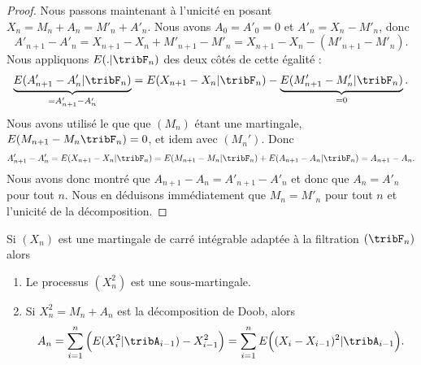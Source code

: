 \begin{proof}
    Nous passons maintenant à l'unicité en posant \( X_n=M_n+A_n=M'_n+A'_n\). Nous avons \( A_0=A'_0=0\) et \( A'_n=X_n-M'_n\), donc
    \begin{equation}
        A'_{n+1}-A'_n=X_{n+1}-X_n+M'_{n+1}-M'_n=X_{n+1}-X_n-(M'_{n+1}-M'_n).
    \end{equation}
    Nous appliquons \( E(.|\tribF_n)\) des deux côtés de cette égalité :
    \begin{equation}
        \underbrace{E(A'_{n+1}-A'_n|\tribF_n)}_{=A'_{n+1}-A'_n}=E(X_{n+1}-X_n|\tribF_n)-\underbrace{E(M'_{n+1}-M'_n|\tribF_n)}_{=0}.
    \end{equation}
    Nous avons utilisé le que que \( (M_n)\) étant une martingale, \( E(M_{n+1}-M_n\tribF_n)=0\), et idem avec \( (M_n')\). Donc
    \begin{equation}
        A'_{n+1}-A'_n=E(X_{n+1}-X_n|\tribF_n)=E(M_{n+1}-M_n|\tribF_n)+E(A_{n+1}-A_n|\tribF_n)=A_{n+1}-A_n.
    \end{equation}
    Nous avons donc montré que \( A_{n+1}-A_n=A'_{n+1}-A'_n\) et donc que \( A_n=A'_n\) pour tout \( n\). Nous en déduisons immédiatement que \( M_n=M'_n\) pour tout \( n\) et l'unicité de la décomposition.
\end{proof}

\begin{lemma}   \label{LemPVgeKfc}
    Si \( (X_n)\) est une martingale de carré intégrable adaptée à la filtration \( (\tribF_n)\) alors
    \begin{enumerate}
        \item
            Le processus \( (X_n^2)\) est une sous-martingale.
        \item
            Si \( X_n^2=M_n+A_n\) est la décomposition de Doob, alors
            \begin{equation}    \label{EqSTGxVWP}
                A_n=\sum_{i=1}^n\Big( E(X_i^2|\tribA_{i-1})-X_{i-1}^2 \Big)=\sum_{i=1}^nE\Big( (X_i-X_{i-1})^2|\tribA_{i-1} \Big).
            \end{equation}
    \end{enumerate}
\end{lemma}

